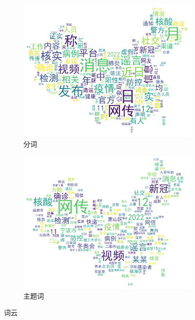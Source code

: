 \documentclass[UTF8]{ctexart}
\newcommand{\figwidth}{0.8\linewidth}
\begin{document}
\begin{figure}[!ht]
    \centering
    \begin{subfigure}[b]{0.45\textwidth}
        \centering
        \includegraphics[width=\figwidth]{../figures/wordcloud_tokens}
        \caption{分词}
        \label{subfig:wordcloud_tokens}
    \end{subfigure}
    \hfill
    \begin{subfigure}[b]{0.45\textwidth}
        \centering
        \includegraphics[width=\figwidth]{../figures/wordcloud_topics}
        \caption{主题词}
        \label{subfig:wordcloud_topics}
    \end{subfigure}
    \caption{词云}
    \label{fig:wordcloud}
\end{figure}
\end{document}
